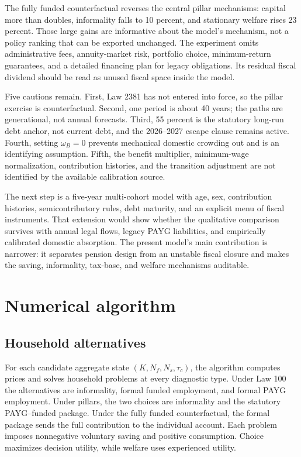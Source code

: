 \documentclass[12pt]{article}
\newcommand{\1}{\mathbf{1}}
\begin{document}
The fully funded counterfactual reverses the central pillar mechanisms: capital more than
doubles, informality falls to 10 percent, and stationary welfare rises 23 percent. Those large
gains are informative about the model's mechanism, not a policy ranking that can be exported
unchanged. The experiment omits administrative fees, annuity-market risk, portfolio choice,
minimum-return guarantees, and a detailed financing plan for legacy obligations. Its residual
fiscal dividend should be read as unused fiscal space inside the model.

Five cautions remain. First, Law 2381 has not entered into force, so the pillar exercise is
counterfactual. Second, one period is about 40 years; the paths are generational, not annual
forecasts. Third, 55 percent is the statutory long-run debt anchor, not current debt, and the
2026--2027 escape clause remains active. Fourth, setting $\omega_B=0$ prevents mechanical
domestic crowding out and is an identifying assumption. Fifth, the benefit multiplier,
minimum-wage normalization, contribution histories, and the transition adjustment are not
identified by the available calibration source.

The next step is a five-year multi-cohort model with age, sex, contribution histories,
semicontributory rules, debt maturity, and an explicit menu of fiscal instruments. That
extension would show whether the qualitative comparison survives with annual legal flows,
legacy PAYG liabilities, and empirically calibrated domestic absorption. The present model's
main contribution is narrower: it separates pension design from an unstable fiscal closure
and makes the saving, informality, tax-base, and welfare mechanisms auditable.

\appendix
\section{Numerical algorithm}

\subsection{Household alternatives}

For each candidate aggregate state $(K,N_f,N_s,\tau_c)$, the algorithm computes prices and
solves household problems at every diagnostic type. Under Law 100 the alternatives are
informality, formal funded employment, and formal PAYG employment. Under pillars, the two
choices are informality and the statutory PAYG--funded package. Under the fully funded
counterfactual, the formal package sends the full contribution to the individual account.
Each problem imposes nonnegative voluntary saving and positive consumption. Choice maximizes
decision utility, while welfare uses experienced utility.
\end{document}
